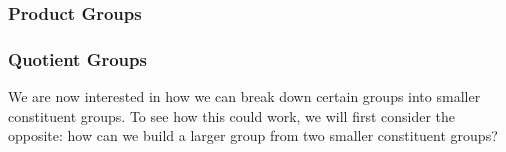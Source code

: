 
\subsubsection{Product Groups}




\subsubsection{Quotient Groups}
We are now interested in how we can break down certain groups into smaller constituent groups. To see how this could work, we will first consider the opposite: how can we build a larger group from two smaller constituent groups?








